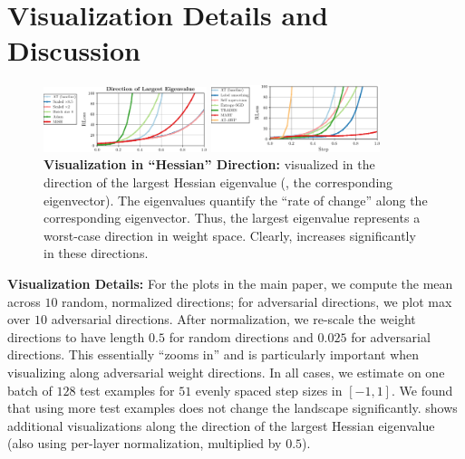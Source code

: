 \section{Visualization Details and Discussion}
\label{sec:supp-visualization}

\begin{figure}[t]
	\centering
	\vspace*{-0.2cm}
	\includegraphics[width=0.425\textwidth]{plots_supp_hessian}
	\vspace*{2px}
	
	\hspace*{-0.35cm}
	\includegraphics[width=0.44\textwidth]{plots_supp_hessian2}
	\vspace*{-4px}
	\caption{\textbf{Visualization in ``Hessian'' Direction:} \RCE visualized in the direction of the largest Hessian eigenvalue (\ie, the corresponding eigenvector). The eigenvalues quantify the ``rate of change'' along the corresponding eigenvector. Thus, the largest eigenvalue represents a worst-case direction in weight space. Clearly, \RCE increases significantly in these directions.}
	\label{fig:supp-visualization}
	\vspace*{-6px}
\end{figure}

\textbf{Visualization Details:}
%
For the plots in the main paper, we compute the mean \RCE across $10$ random, normalized directions; for adversarial directions, we plot max \RCE over $10$ adversarial directions. After normalization, we re-scale the weight directions to have length $0.5$ for random directions and $0.025$ for adversarial directions. This essentially ``zooms in'' and is particularly important when visualizing along adversarial weight directions. In all cases, we estimate \RCE on one batch of $128$ test examples for $51$ evenly spaced  step sizes in $[-1, 1]$. We found that using more test examples does not change the \RCE landscape significantly.  shows additional visualizations along the direction of the largest Hessian eigenvalue (also using per-layer normalization, multiplied by $0.5$).

